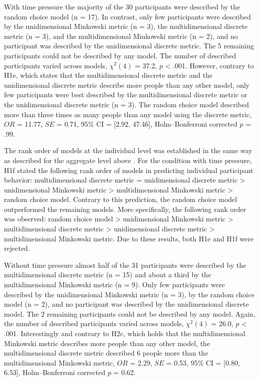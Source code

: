 \documentclass[a4paper,man,natbib]{apa6}
\begin{document}
With time pressure the majority of the 30 participants were described by the random choice model (n = 17). In contrast, only few participants were described by the unidimensional Minkowski metric (n = 3), the multidimensional discrete metric (n = 3), and the multidimensional Minkowski metric (n = 2), and no participant was described by the unidimensional discrete metric. The 5 remaining participants could not be described by any model. The number of described participants varied across models, $\chi^{2}(4)$ = 37.2, $p$ < .001. However, contrary to H1e, which states that the multidimensional discrete metric and the unidimensional discrete metric describe more people than any other model, only few participants were best described by the multidimensional discrete metric or the unidimensional discrete metric (n = 3). The random choice model described more than three times as many people than any model using the discrete metric, $OR$ = 11.77, $SE$ = 0.71, 95\% CI = [2.92, 47.46], Holm--Bonferroni corrected $p$ = .99. 

The rank order of models at the individual level was established in the same way as described for the aggregate level above \citep[see also][p. 194]{wagenmakers2004aic}. For the condition with time pressure, H1f stated the following rank order of models in predicting individual participant behavior: multidimensional discrete metric = unidimensional discrete metric > unidimensional Minkowski metric > multidimensional Minkowski metric > random choice model. Contrary to this prediction, the random choice model outperformed the remaining models. More specifically, the following rank order was observed: random choice model > unidimensional Minkowski metric > multidimensional discrete metric > unidimensional discrete metric > multidimensional Minkowski metric. Due to these results, both H1e and H1f were rejected.

Without time pressure almost half of the 31 participants were described by the multidimensional discrete metric (n = 15) and about a third by the multidimensional Minkowski metric (n = 9). Only few participants were described by the unidimensional Minkowski metric (n = 3), by the random choice model (n = 2), and no participant was described by the unidimensional discrete model. The 2 remaining participants could not be described by any model. Again, the number of described participants varied across models, $\chi^{2}(4)$ = 26.0, $p$ < .001. Interestingly and contrary to H2c, which holds that the multidimensional Minkowski metric describes more people than any other model, the multidimensional discrete metric described 6 people more than the multidimensional Minkowski metric, $OR$ = 2.29, $SE$ = 0.53, 95\% CI = [0.80, 6.53], Holm--Bonferroni corrected $p$ = 0.62. 
\end{document}
